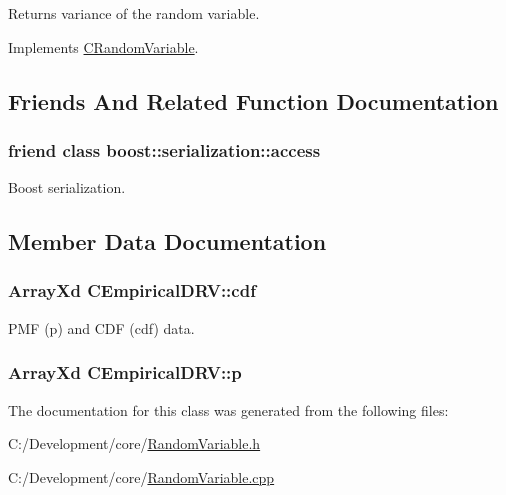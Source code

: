 Returns variance of the random variable. 



Implements \hyperlink{class_c_random_variable_a3b0b87c4aab74c0406cd8321b8b96747}{C\-Random\-Variable}.



\subsection{Friends And Related Function Documentation}
\hypertarget{class_c_empirical_d_r_v_ac98d07dd8f7b70e16ccb9a01abf56b9c}{
\subsubsection[{boost\-::serialization\-::access}]{\setlength{\rightskip}{0pt plus 5cm}friend class boost\-::serialization\-::access\hspace{0.3cm}{\ttfamily [friend]}}}\label{class_c_empirical_d_r_v_ac98d07dd8f7b70e16ccb9a01abf56b9c}


Boost serialization. 



\subsection{Member Data Documentation}
\hypertarget{class_c_empirical_d_r_v_aceab7d27df5fefbaaa64ab7b2e410763}{
\subsubsection[{cdf}]{\setlength{\rightskip}{0pt plus 5cm}Array\-Xd C\-Empirical\-D\-R\-V\-::cdf\hspace{0.3cm}{\ttfamily [private]}}}\label{class_c_empirical_d_r_v_aceab7d27df5fefbaaa64ab7b2e410763}
P\-M\-F (p) and C\-D\-F (cdf) data. \hypertarget{class_c_empirical_d_r_v_a854fc8afdf4194880c978b91baff4852}{
\subsubsection[{p}]{\setlength{\rightskip}{0pt plus 5cm}Array\-Xd C\-Empirical\-D\-R\-V\-::p\hspace{0.3cm}{\ttfamily [private]}}}\label{class_c_empirical_d_r_v_a854fc8afdf4194880c978b91baff4852}


The documentation for this class was generated from the following files\-:\begin{DoxyCompactItemize}
\item 
C\-:/\-Development/core/\hyperlink{_random_variable_8h}{Random\-Variable.\-h}\item 
C\-:/\-Development/core/\hyperlink{_random_variable_8cpp}{Random\-Variable.\-cpp}\end{DoxyCompactItemize}
